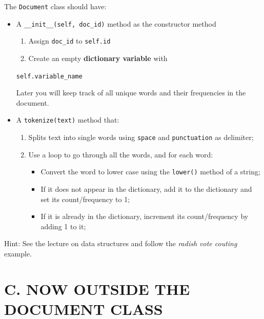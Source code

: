 \documentclass[
  letterpaper,
]{scrbook}
\providecommand{\tightlist}{%
  \setlength{\itemsep}{0pt}\setlength{\parskip}{0pt}}
\begin{document}
The \texttt{Document} class should have:

\begin{itemize}
\item
  A \texttt{\_\_init\_\_(self,\ doc\_id)} method as the constructor
  method

  \begin{enumerate}
  \def\labelenumi{\arabic{enumi}.}
  \tightlist
  \item
    Assign \texttt{doc\_id} to \texttt{self.id}
  \item
    Create an empty \textbf{dictionary variable} with
  \end{enumerate}

  \texttt{self.variable\_name}

  Later you will keep track of all unique words and their frequencies in
  the document.
\item
  A \texttt{tokenize(text)} method that:

  \begin{enumerate}
  \def\labelenumi{\arabic{enumi}.}
  \tightlist
  \item
    Splits text into single words using \texttt{space} and
    \texttt{punctuation} as delimiter;
  \item
    Use a loop to go through all the words, and for each word:

    \begin{itemize}
    \tightlist
    \item
      Convert the word to lower case using the \texttt{lower()} method
      of a string;
    \item
      If it does not appear in the dictionary, add it to the dictionary
      and set its count/frequency to 1;
    \item
      If it is already in the dictionary, increment its count/frequency
      by adding 1 to it;
    \end{itemize}
  \end{enumerate}
\end{itemize}

Hint: See the lecture on data structures and follow the \emph{radish
vote couting} example.

\section*{C. NOW OUTSIDE THE DOCUMENT
CLASS}\label{c.-now-outside-the-document-class}
\end{document}
